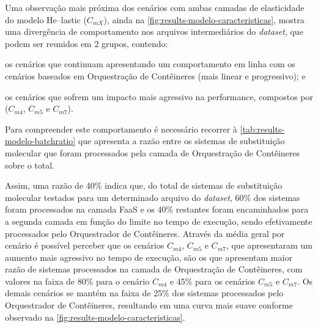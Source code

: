 \documentclass[english,brazilian]{UNISINOSmonografia} %
\begin{document}
Uma observação mais próxima dos cenários com ambas camadas de elasticidade do modelo \textsf{He}--lastic ($C_{mX}$), ainda na \autoref{fig:results-modelo-caracteristicas}, mostra uma divergência de comportamento nos arquivos intermediários do \textit{dataset}, que podem ser reunidos em 2 grupos, contendo:
\begin{inparaenum} 
	\item os cenários que continuam apresentando um comportamento em linha com os cenários baseados em Orquestração de Contêineres (mais linear e progressivo); e
	\item os cenários que sofrem um impacto mais agressivo na performance, compostos por ($C_{m4}$, $C_{m5}$ e $C_{m7}$).
\end{inparaenum}
%
Para compreender este comportamento é necessário recorrer à \autoref{tab:results-modelo-batchratio} que apresenta a razão entre os sistemas de substituição molecular que foram processados pela camada de Orquestração de Contêineres sobre o total.



Assim, uma razão de 40\% indica que, do total de sistemas de substituição molecular testados para um determinado arquivo do \textit{dataset}, 60\% dos sistemas foram processados na camada FaaS e os 40\% restantes foram encaminhados para a segunda camada em função do limite no tempo de execução, sendo efetivamente processados pelo Orquestrador de Contêineres.
%
Através da média geral por cenário é possível perceber que os cenários $C_{m4}$, $C_{m5}$ e $C_{m7}$, que apresentaram um aumento mais agressivo no tempo de execução, são os que apresentam maior razão de sistemas processados na camada de Orquestração de Contêineres, com valores na faixa de 80\% para o cenário $C_{m4}$ e 45\% para os cenários $C_{m5}$ e $C_{m7}$.
Os demais cenários se mantém na faixa de 25\% dos sistemas processados pelo Orquestrador de Contêineres, resultando em uma curva mais suave conforme observado na \autoref{fig:results-modelo-caracteristicas}.
\end{document}
